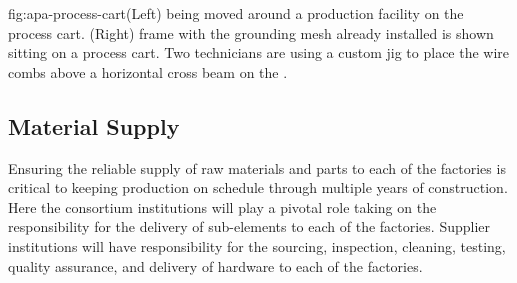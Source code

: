 \begin{dunefigure}{fig:apa-process-cart}{(Left)  being moved around a production facility on the process cart. (Right)  frame with the grounding mesh already installed is shown sitting on a process cart.  Two technicians are using a custom jig to place the wire combs above a horizontal cross beam on the .}
\setlength{\fboxsep}{0pt}
\setlength{\fboxrule}{0.5pt}
\end{dunefigure}

\subsection{Material Supply}  

Ensuring the reliable supply of raw materials and parts to each of the factories is critical to keeping  production on schedule through multiple years of construction. Here the consortium institutions will play a pivotal role taking on the responsibility for the delivery of  sub-elements to each of the factories. Supplier institutions will have responsibility for the sourcing, inspection, cleaning, testing, quality assurance, and delivery of hardware to each of the factories. 

